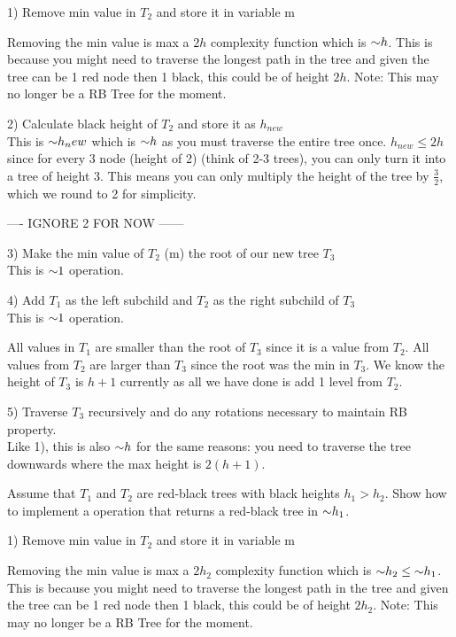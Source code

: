 \begin{problem}
\begin{questions}
1) Remove min value in $T_2$ and store it in variable m

Removing the min value is max a $2h$ complexity function which is $\mathord{\sim}h$. This is because you might need to traverse the longest path in the tree and given the tree can be 1 red node then 1 black, this could be of height $2h$.
Note: This may no longer be a RB Tree for the moment.

2) Calculate black height of $T_2$ and store it as $h_{new}$\\
This is $\mathord{\sim}h_new$ which is $\mathord{\sim}h$ as you must traverse the entire tree once. $h_{new} \leq 2h$ since for every 3 node (height of 2) (think of 2-3 trees), you can only turn it into a tree of height 3. This means you can only multiply the height of the tree by $\frac{3}{2}$, which we round to 2 for simplicity. 

---- IGNORE 2 FOR NOW ------

3) Make the min value of $T_2$ (m) the root of our new tree $T_3$\\
This is $\mathord{\sim}1$ operation.

4) Add $T_1$ as the left subchild and $T_2$ as the right subchild of $T_3$\\
This is $\mathord{\sim}1$ operation.

All values in $T_1$ are smaller than the root of $T_3$ since it is a value from $T_2$. All values from $T_2$ are larger than $T_3$ since the root was the min in $T_3$.
We know the height of $T_3$ is $h+1$ currently as all we have done is add 1 level from $T_2$.

5) Traverse $T_3$ recursively and do any rotations necessary to maintain RB property.\\
Like 1), this is also $\mathord{\sim}h$ for the same reasons: you need to traverse the tree downwards where the max height is $2(h+1)$.


\item Assume that $T_1$ and $T_2$ are red-black trees with black heights $h_1 > h_2$. Show how to implement a  operation that returns a red-black tree in $\mathord{\sim}h_1$.

1) Remove min value in $T_2$ and store it in variable m

Removing the min value is max a $2h_2$ complexity function which is $\mathord{\sim}h_2 \leq \mathord{\sim}h_1$. This is because you might need to traverse the longest path in the tree and given the tree can be 1 red node then 1 black, this could be of height $2h_2$.
Note: This may no longer be a RB Tree for the moment.


\end{questions}
\end{problem}
